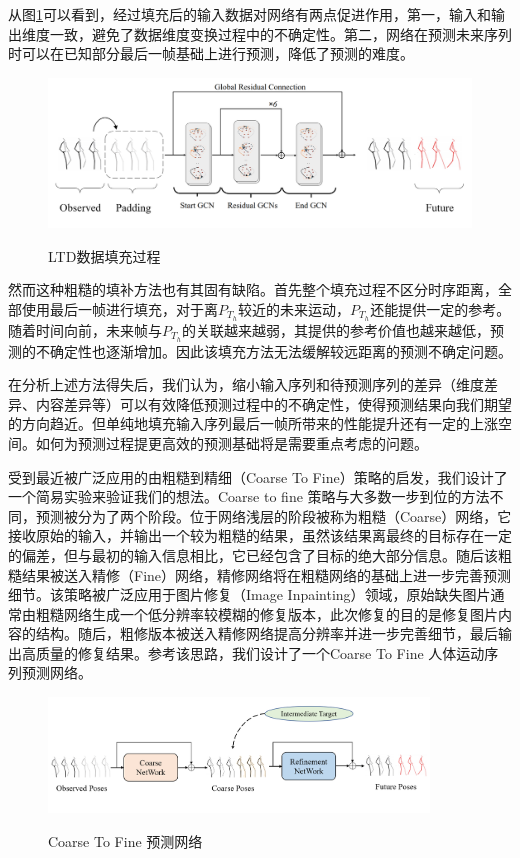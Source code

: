 从图\ref{fig:LTD_padding}可以看到，经过填充后的输入数据对网络有两点促进作用，第一，输入和输出维度一致，避免了数据维度变换过程中的不确定性。第二，网络在预测未来序列时可以在已知部分最后一帧基础上进行预测，降低了预测的难度。
\begin{figure}[ht]
    \centering
    \includegraphics[width=1\textwidth]{FigMa/LTD_padding.png}\\
    \vspace{-0.3cm}
    \caption{LTD数据填充过程}
    \label{fig:LTD_padding}
\end{figure}
然而这种粗糙的填补方法也有其固有缺陷。首先整个填充过程不区分时序距离，全部使用最后一帧进行填充，对于离$P_{T_h}$较近的未来运动，$P_{T_h}$还能提供一定的参考。随着时间向前，未来帧与$P_{T_h}$的关联越来越弱，其提供的参考价值也越来越低，预测的不确定性也逐渐增加。因此该填充方法无法缓解较远距离的预测不确定问题。

在分析上述方法得失后，我们认为，缩小输入序列和待预测序列的差异（维度差异、内容差异等）可以有效降低预测过程中的不确定性，使得预测结果向我们期望的方向趋近。但单纯地填充输入序列最后一帧所带来的性能提升还有一定的上涨空间。如何为预测过程提更高效的预测基础将是需要重点考虑的问题。

受到最近被广泛应用的由粗糙到精细（Coarse To Fine）策略的启发，我们设计了一个简易实验来验证我们的想法。Coarse to fine 策略与大多数一步到位的方法不同，预测被分为了两个阶段。位于网络浅层的阶段被称为粗糙（Coarse）网络，它接收原始的输入，并输出一个较为粗糙的结果，虽然该结果离最终的目标存在一定的偏差，但与最初的输入信息相比，它已经包含了目标的绝大部分信息。随后该粗糙结果被送入精修（Fine）网络，精修网络将在粗糙网络的基础上进一步完善预测细节。该策略被广泛应用于图片修复（Image Inpainting）\parencite{yu2018generative,zamir2021multi}领域，原始缺失图片通常由粗糙网络生成一个低分辨率较模糊的修复版本，此次修复的目的是修复图片内容的结构。随后，粗修版本被送入精修网络提高分辨率并进一步完善细节，最后输出高质量的修复结果。参考该思路，我们设计了一个Coarse To Fine 人体运动序列预测网络。

\begin{figure}[ht]
    \centering
    \includegraphics[width=0.9\textwidth]{FigMa/Two_stage.png}\\
    \vspace{-0.3cm}
    \caption{Coarse To Fine 预测网络}
    \label{fig:Two_stage}
\end{figure}